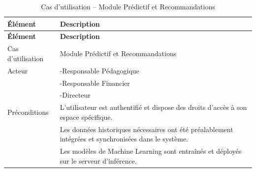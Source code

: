 {
\begin{longtable}{|l|p{12cm}|}
\caption{Cas d'utilisation -- Module Prédictif et Recommandations}
\label{tab:module_ia} \\
\hline
\textbf{Élément} & \textbf{Description} \\
\hline
\endfirsthead
\hline
\textbf{Élément} & \textbf{Description} \\
\hline
\endhead

Cas d'utilisation & Module Prédictif et Recommandations \\
\hline

Acteur &
-Responsable Pédagogique \\
&-Responsable Financier \\
&-Directeur \\
\hline

Préconditions &
L'utilisateur est authentifié et dispose des droits d'accès à son espace spécifique. \\
& Les données historiques nécessaires ont été préalablement intégrées et synchronisées dans le système. \\
& Les modèles de Machine Learning sont entraînés et déployés sur le serveur d'inférence. \\
\hline


\end{longtable}}
